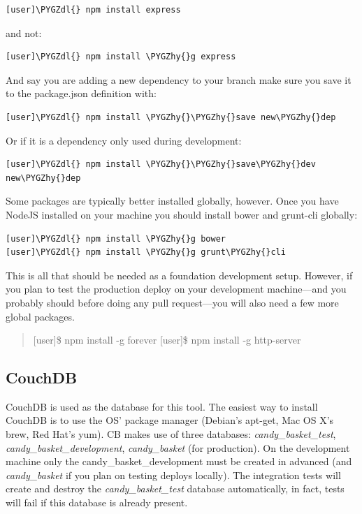 \documentclass[letterpaper,10pt,english]{sphinxmanual}
\def\PYGZdl{\char`\$}
\def\PYGZhy{\char`\-}
\begin{document}
\begin{Verbatim}[commandchars=\\\{\}]
[user]\PYGZdl{} npm install express
\end{Verbatim}

and not:

\begin{Verbatim}[commandchars=\\\{\}]
[user]\PYGZdl{} npm install \PYGZhy{}g express
\end{Verbatim}

And say you are adding a new dependency to your branch make sure you
save it to the package.json definition with:

\begin{Verbatim}[commandchars=\\\{\}]
[user]\PYGZdl{} npm install \PYGZhy{}\PYGZhy{}save new\PYGZhy{}dep
\end{Verbatim}

Or if it is a dependency only used during development:

\begin{Verbatim}[commandchars=\\\{\}]
[user]\PYGZdl{} npm install \PYGZhy{}\PYGZhy{}save\PYGZhy{}dev new\PYGZhy{}dep
\end{Verbatim}

Some packages are typically better installed globally, however. Once
you have NodeJS installed on your machine you should install bower and
grunt-cli globally:

\begin{Verbatim}[commandchars=\\\{\}]
[user]\PYGZdl{} npm install \PYGZhy{}g bower
[user]\PYGZdl{} npm install \PYGZhy{}g grunt\PYGZhy{}cli
\end{Verbatim}

This is all that should be needed as a foundation development
setup. However, if you plan to test the production deploy on your
development machine---and you probably should before doing any pull
request---you will also need a few more global packages.
\begin{quote}

{[}user{]}\$ npm install -g forever
{[}user{]}\$ npm install -g http-server
\end{quote}


\subsection{CouchDB}
\label{developer-guide:couchdb}\label{developer-guide:id1}
CouchDB is used as the database for this tool. The easiest way to
install CouchDB is to use the OS' package manager (Debian's apt-get,
Mac OS X's brew, Red Hat's yum). CB makes use of three databases:
\emph{candy\_basket\_test}, \emph{candy\_basket\_development}, \emph{candy\_basket} (for
production). On the development machine only the
candy\_basket\_development must be created in advanced (and
\emph{candy\_basket} if you plan on testing deploys locally). The
integration tests will create and destroy the \emph{candy\_basket\_test}
database automatically, in fact, tests will fail if this database is
already present.
\end{document}
